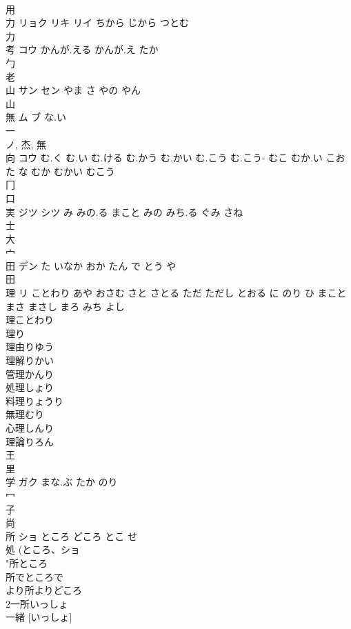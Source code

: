 \documentclass[8pt]{extreport}
\begin{document}
\begin{CJK}{UTF8}{min}
\\	用 
\\	力	リョク リキ リイ	ちから じから つとむ	
\\	力 
\\	考	コウ	かんが.える かんが.え たか	
\\	勹 
\\	老 
\\	山	サン セン	やま さ やの やん	
\\	山 
\\	無	ム ブ	な.い	
\\	一 
\\	ノ, 杰, 無 
\\	向	コウ	む.く む.い む.ける む.かう む.かい む.こう む.こう- むこ むか.い こお た な むか むかい むこう	
\\	冂 
\\	口 
\\	実	ジツ シツ	み みの.る まこと みの みち.る ぐみ さね	
\\	士 
\\	大 
\\	宀 
\\	田	デン	た いなか おか たん で とう や	
\\	田 
\\	理	リ	ことわり あや おさむ さと さとる ただ ただし とおる に のり ひ まこと まさ まさし まろ みち よし	
\\	理ことわり
\\	理り
\\	理由りゆう
\\	理解りかい
\\	管理かんり
\\	処理しょり
\\	料理りょうり
\\	無理むり
\\	心理しんり
\\	理論りろん
\\	王 
\\	里 
\\	学	ガク	まな.ぶ たか のり	
\\	冖 
\\	子 
\\	尚 
\\	所	ショ	ところ どころ とこ せ	
\\	処 (ところ、ショ 
\\	"所ところ
\\	所でところで
\\	より所よりどころ
\\	2一所いっしょ
\\	一緒 [いっしょ] 

\end{CJK}
\end{document}
